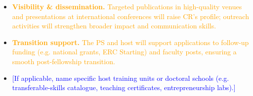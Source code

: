 \documentclass[11pt,draftproposal]{msca-pf}
\begin{document}
\begin{itemize}[noitemsep,topsep=2pt]
  \item \textcolor{orange}{\textbf{Visibility \& dissemination.} Targeted publications in high-quality venues and presentations at international conferences will raise CR’s profile; outreach activities will strengthen broader impact and communication skills.}
  \item \textcolor{orange}{\textbf{Transition support.} The PS and host will support applications to follow-up funding (e.g. national grants, ERC Starting) and faculty posts, ensuring a smooth post-fellowship transition.}
  \item \textcolor{blue}{[If applicable, name specific host training units or doctoral schools (e.g. transferable-skills catalogue, teaching certificates, entrepreneurship labs).]}
\end{itemize}
\end{document}
